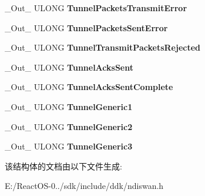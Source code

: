 \begin{DoxyCompactItemize}
\+\_\+\+Out\+\_\+ U\+L\+O\+NG {\bfseries Tunnel\+Packets\+Transmit\+Error}
\item 
\mbox{\label{struct___n_d_i_s___w_a_n___c_o___g_e_t___s_t_a_t_s___i_n_f_o_a94014e0aa3edceb03bff25796d8c8f93}} 
\+\_\+\+Out\+\_\+ U\+L\+O\+NG {\bfseries Tunnel\+Packets\+Sent\+Error}
\item 
\mbox{\label{struct___n_d_i_s___w_a_n___c_o___g_e_t___s_t_a_t_s___i_n_f_o_ad6b6fd1b3b9bb1c65fcc01159bde6024}} 
\+\_\+\+Out\+\_\+ U\+L\+O\+NG {\bfseries Tunnel\+Transmit\+Packets\+Rejected}
\item 
\mbox{\label{struct___n_d_i_s___w_a_n___c_o___g_e_t___s_t_a_t_s___i_n_f_o_a39a3743d7e01a0207e0ed7744a00ed1d}} 
\+\_\+\+Out\+\_\+ U\+L\+O\+NG {\bfseries Tunnel\+Acks\+Sent}
\item 
\mbox{\label{struct___n_d_i_s___w_a_n___c_o___g_e_t___s_t_a_t_s___i_n_f_o_a034a2418ab51ed93f8300b6b0a79f1c9}} 
\+\_\+\+Out\+\_\+ U\+L\+O\+NG {\bfseries Tunnel\+Acks\+Sent\+Complete}
\item 
\mbox{\label{struct___n_d_i_s___w_a_n___c_o___g_e_t___s_t_a_t_s___i_n_f_o_a6e9698b994f8866604ac6d45bf7ff64f}} 
\+\_\+\+Out\+\_\+ U\+L\+O\+NG {\bfseries Tunnel\+Generic1}
\item 
\mbox{\label{struct___n_d_i_s___w_a_n___c_o___g_e_t___s_t_a_t_s___i_n_f_o_a49069b1725686869f621085035ca2ab3}} 
\+\_\+\+Out\+\_\+ U\+L\+O\+NG {\bfseries Tunnel\+Generic2}
\item 
\mbox{\label{struct___n_d_i_s___w_a_n___c_o___g_e_t___s_t_a_t_s___i_n_f_o_afadd3e21a28fb6752672cfc7eda60fdd}} 
\+\_\+\+Out\+\_\+ U\+L\+O\+NG {\bfseries Tunnel\+Generic3}
\end{DoxyCompactItemize}


该结构体的文档由以下文件生成\+:\begin{DoxyCompactItemize}
\item 
E\+:/\+React\+O\+S-\/0../sdk/include/ddk/ndiswan.\+h\end{DoxyCompactItemize}
